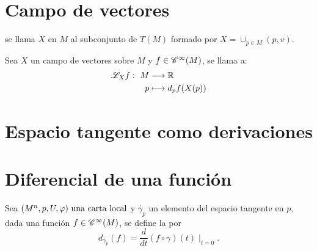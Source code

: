 \section{Campo de vectores}\label{sec:campo-de-vectores}
\begin{definition}
  se llama  $X$ en $M$ al subconjunto de $T(M)$ formado por
  $X=\cup_{p\in M}(p,v)$.
\end{definition}

\begin{definition}
  Sea $X$ un campo de vectores sobre $M$ y $f\in\mathscr{C}^\infty(M)$, se llama  a:
  \begin{equation}
    \label{eq:derivada-lie-funcion-campo}
    \begin{alignedat}{1}
      \mathscr{L}_X f:\ M & \longrightarrow \mathbb{R} \\ p & \longmapsto d_p f(X(p))
    \end{alignedat}
  \end{equation}
\end{definition}


\section{Espacio tangente como derivaciones}\label{sec:espacio-tangente-como-derivaciones}


\section{Diferencial de una función}\label{sec:diferencial-de-una-funcion}
\begin{definition}
  Sea $(M^n,p,U,\varphi)\textmd{ una carta local}$ y $\mathring{\gamma_p}$ un elemento del espacio tangente en $p$, dada una
  función
  $f\in\mathscr{C}^\infty(M)$, se define la  por
  \begin{equation}
    \label{eq:diferencial-funcion-punto}
    d_{\mathring{\gamma_p}}(f)=\frac{d}{dt}(f\circ\gamma)(t)\mid_{t=0}.
  \end{equation}
\end{definition}
